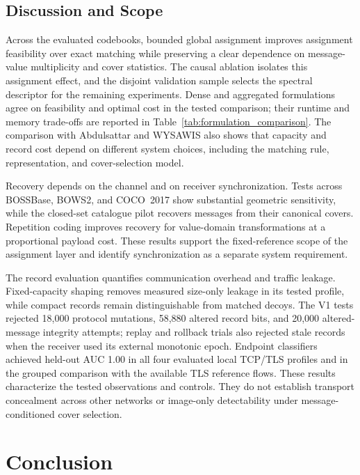 \documentclass[preprint,12pt]{elsarticle}
\theoremstyle{plain}
\begin{document}
\subsection{Discussion and Scope}

Across the evaluated codebooks, bounded global assignment improves
assignment feasibility over exact matching while preserving a clear
dependence on message-value multiplicity and cover statistics. The causal
ablation isolates this assignment effect, and the disjoint validation sample
selects the spectral descriptor for the remaining experiments. Dense and
aggregated formulations agree on feasibility and optimal cost in the tested
comparison; their runtime and memory trade-offs are reported in
Table~\ref{tab:formulation_comparison}. The comparison with Abdulsattar and
WYSAWIS also shows that capacity and record cost depend on different system
choices, including the matching rule, representation, and cover-selection
model.

Recovery depends on the channel and on receiver synchronization. Tests across
BOSSBase, BOWS2, and COCO~2017 show substantial geometric sensitivity, while
the closed-set catalogue pilot recovers messages from their canonical covers.
Repetition coding improves recovery for value-domain transformations at a
proportional payload cost. These results support the fixed-reference scope of
the assignment layer and identify synchronization as a separate system
requirement.

The record evaluation quantifies communication overhead and traffic leakage.
Fixed-capacity shaping removes measured size-only leakage in its tested
profile, while compact records remain distinguishable from matched decoys.
The V1 tests rejected 18,000 protocol mutations, 58,880 altered record bits,
and 20,000 altered-message integrity attempts; replay and rollback trials also
rejected stale records when the receiver used its external monotonic epoch.
Endpoint classifiers achieved held-out AUC 1.00 in all four evaluated local
TCP/TLS profiles and in the grouped comparison with the available TLS
reference flows. These results characterize the tested observations and
controls. They do not establish transport concealment across other networks
or image-only detectability under message-conditioned cover selection.

\section{Conclusion}
\label{sec:conclusion}
\end{document}
